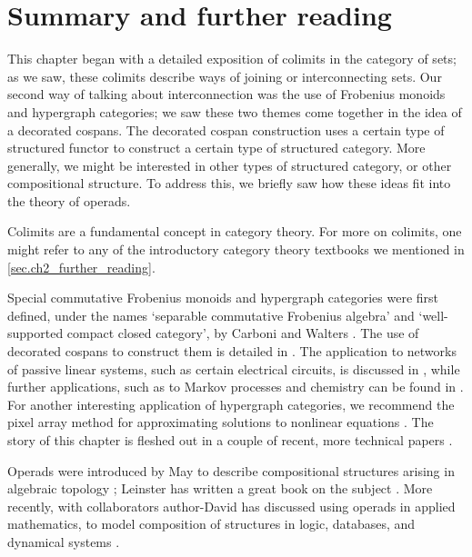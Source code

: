 \documentclass[7Sketches]{subfiles}
\begin{document}
%

\section{Summary and further reading}%
\label{sec.c6_further_reading}

This chapter began with a detailed exposition of colimits in the category of
sets; as we saw, these colimits describe ways of joining or interconnecting sets. Our
second way of talking about interconnection was the use of Frobenius monoids and
hypergraph categories; we saw these two themes come together in the idea of a
decorated cospans. The decorated cospan construction uses a certain type of
structured functor to construct a certain type of structured category. More
generally, we might be interested in other types of structured category, or
other compositional structure. To address this, we briefly saw how these ideas
fit into the theory of operads.

Colimits are a fundamental concept in category theory. For more on colimits,
one might refer to any of the introductory category theory
textbooks we mentioned in \cref{sec.ch2_further_reading}.

Special commutative Frobenius monoids and hypergraph categories were first
defined, under the names `separable commutative Frobenius algebra' and `well-supported compact closed category', by Carboni and Walters
\cite{Carboni:1987a,Carboni:1991a}. The use of
decorated cospans to construct them is detailed in
\cite{fong2015decorated,fong2017decorated,Fong:2016a}. The application to
networks of passive linear systems, such as certain electrical circuits, is
discussed in \cite{baez2015compositional}, while further applications, such as to Markov
processes and chemistry can be found in
\cite{baez2016compositional,baez2017compositional}. For another interesting application of hypergraph
categories, we recommend the pixel array method for approximating solutions to
nonlinear equations \cite{Spivak.Dobson.Kumari.Wu:2016a}.%
 The story of this chapter is fleshed out in a couple of
recent, more technical papers \cite{fong2018hypergraph,Fong.Sarazola:2018}.

Operads were introduced by May to describe compositional structures arising in
algebraic topology \cite{May:1972a}; Leinster has written a great book on the subject
\cite{Leinster:2004a}. More recently, with collaborators author-David has discussed
using operads in applied mathematics, to model composition of structures in
logic, databases, and dynamical systems
\cite{Rupel.Spivak:2013a,Spivak:2013b,Vagner.Spivak.Lerman:2015a}. 
\end{document}
